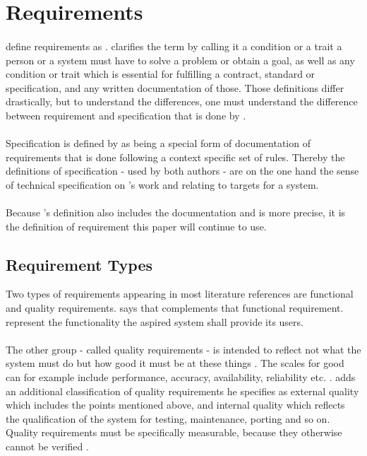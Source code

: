 \section{Requirements}
\paragraph{} \textcite[4]{Sommerville.2000} define requirements as . \textcite[13]{Pohl.2007} clarifies the term by calling it a condition or a trait a person or a system must have to solve a problem or obtain a goal, as well as any condition or trait which is essential for fulfilling a contract, standard or specification, and any written documentation of those. Those definitions differ drastically, but to understand the differences, one must understand the difference between requirement and specification that is done by \citeauthor{Pohl.2007}.
\paragraph{} Specification is defined by \textcite[220]{Pohl.2007} as being a special form of documentation of requirements that is done following a context specific set of rules. Thereby the definitions of specification - used by both authors - are on the one hand the sense of technical specification on \citeauthor{Pohl.2007}'s work and \citeauthor{Sommerville.2000} relating to targets for a system. 
\paragraph{} Because \citeauthor{Pohl.2007}'s definition also includes the documentation and is more precise, it is the definition of requirement this paper will continue to use.
\subsection{Requirement Types}
Two types of requirements appearing in most literature references are functional and quality requirements. \textcite[14]{Lauesen.2008} says that  \textcite[cf.][15]{Pohl.2007} complements that functional requirement. represent the functionality the aspired system shall provide its users. 
\paragraph{} The other group - called quality requirements - is intended to reflect not what the system must do but how good it must be at these things \parencite[cf.][15]{Lauesen.2008}. The scales for good can for example include performance, accuracy, availability, reliability etc. \parencite[cf.][15]{Pohl.2007}. \textcite[cf.][29]{Ebert.2014} adds an additional classification of quality requirements he specifies as external quality which includes the points mentioned above, and internal quality which reflects the qualification of the system for testing, maintenance, porting and so on. Quality requirements must be specifically measurable, because they otherwise cannot be verified \parencite[cf.][371-371]{Lauesen.2008}. 
